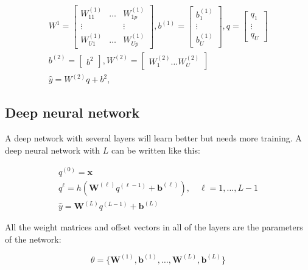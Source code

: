 	\begin{equation}
	\begin{aligned}
		W^{1} = \begin{bmatrix} W^{(1)}_{11} & \ldots& W^{(1)}_{1p} \\ \vdots& & \vdots \\ W^{(1)}_{U1} & \ldots& W^{(1)}_{Up}  \end{bmatrix} , b^{(1)} = \begin{bmatrix} b^{(1)}_1 \\ \vdots \\ b^{(1)}_U \end{bmatrix}, q = \begin{bmatrix} q_1 \\ \vdots \\ q_U \end{bmatrix} \\
		 b^{(2)} = \begin{bmatrix} b^{2} \end{bmatrix}, W^{(2)} = \begin{bmatrix} W^{(2)}_1 \ldots W^{(2)}_U \end{bmatrix} \\
		 \hat{y} = W^{(2)}q + b^{2} ,
	\end{aligned}
	\end{equation}

\subsection*{Deep neural network}
A deep network with several layers will learn better but needs more training. A deep neural network with $L$ can be written like this: 

	\begin{equation}
	\begin{aligned}
		q^{(0)} = \textbf{x} \\
		q^{\ell} = h(\textbf{W}^{(\ell)}q^{(\ell -1)}+\textbf{b}^{(\ell)}), \quad \ell = 1, \ldots, L-1 \\
		\hat{y} = \textbf{W}^{(L)}q^{(L-1)}+ \textbf{b}^{(L)}
	\end{aligned}
	\end{equation}

All the weight matrices and offset vectors in all of the layers are the parameters of the network:

	\begin{equation}
		\textbf{$\theta$} = \{\textbf{W}^{(1)},\textbf{b}^{(1)},\ldots, \textbf{W}^{(L)},\textbf{b}^{(L)}\}
	\end{equation}

